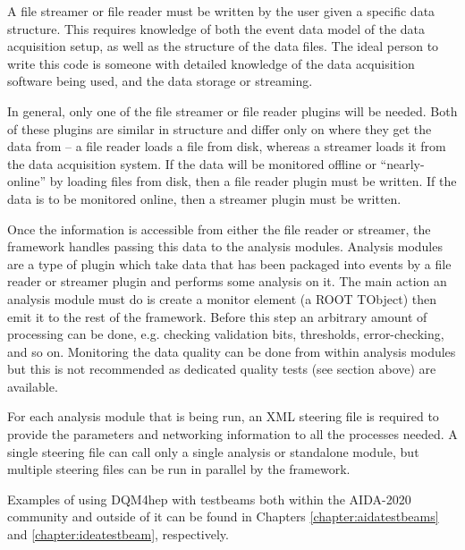 A file streamer or file reader must be written by the user given a specific data structure. This requires knowledge of both the event data model of the data acquisition setup, as well as the structure of the data files. The ideal person to write this code is someone with detailed knowledge of the data acquisition software being used, and the data storage or streaming. 

In general, only one of the file streamer or file reader plugins will be needed. Both of these plugins are similar in structure and differ only on where they get the data from -- a file reader loads a file from disk, whereas a streamer loads it from the data acquisition system. If the data will be monitored offline or ``nearly-online'' by loading files from disk, then a file reader plugin must be written. If the data is to be monitored online, then a streamer plugin must be written. 

Once the information is accessible from either the file reader or streamer, the framework handles passing this data to the analysis modules. Analysis modules are a type of plugin which take data that has been packaged into events by a file reader or streamer plugin and performs some analysis on it. The main action an analysis module must do is create a monitor element (a ROOT TObject) then emit it to the rest of the framework. Before this step an arbitrary amount of processing can be done, e.g. checking validation bits, thresholds, error-checking, and so on. Monitoring the data quality can be done from within analysis modules but this is not recommended as dedicated quality tests (see section above) are available.

For each analysis module that is being run, an \acrshort{XML} steering file is required to provide the parameters and networking information to all the processes needed. A single steering file can call only a single analysis or standalone module, but multiple steering files can be run in parallel by the framework.

Examples of using \acrshort{DQM4hep} with testbeams both within the AIDA-2020 community and outside of it can be found in Chapters \ref{chapter:aidatestbeams} and \ref{chapter:ideatestbeam}, respectively.
